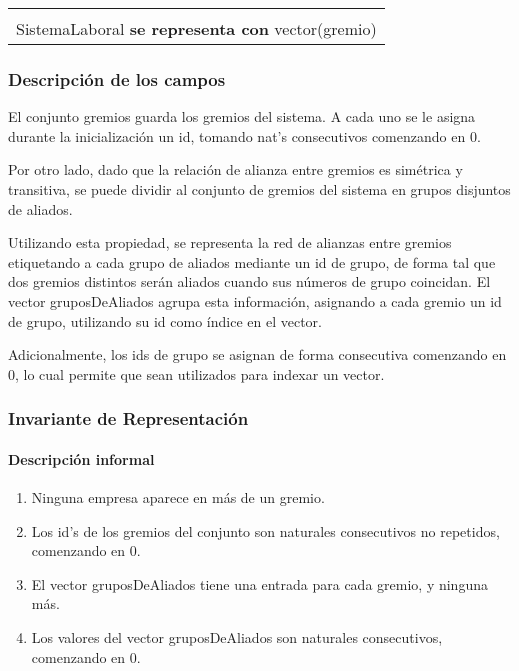 \begin{center}
\begin{tabular}{|l|} 
\hline
\\
SistemaLaboral \textbf{se representa con} vector(gremio) \\
\hline
\end{tabular}
\end{center}

\subsubsection{Descripci\'on de los campos}

	El conjunto gremios guarda los gremios del sistema. A cada uno se le asigna durante la inicializaci\'on un id, tomando nat's consecutivos comenzando en 0.

	Por otro lado, dado que la relaci\'on de alianza entre gremios es sim\'etrica y transitiva, se puede dividir al conjunto de gremios del sistema en grupos disjuntos de aliados.

	Utilizando esta propiedad, se representa la red de alianzas entre gremios etiquetando a cada grupo de aliados mediante un id de grupo, de forma tal que dos gremios distintos ser\'an aliados cuando sus n\'umeros de grupo coincidan. El vector gruposDeAliados agrupa esta informaci\'on, asignando a cada gremio un id de grupo, utilizando su id como \'indice en el vector. 

	Adicionalmente, los ids de grupo se asignan de forma consecutiva comenzando en 0, lo cual permite que sean utilizados para indexar un vector.

\subsubsection{Invariante de Representaci\'on}

\paragraph{Descripci\'on informal}

\begin{enumerate}
	\item Ninguna empresa aparece en m\'as de un gremio.
	\item Los id's de los gremios del conjunto son naturales consecutivos no repetidos, comenzando en 0.
	\item El vector gruposDeAliados tiene una entrada para cada gremio, y ninguna m\'as.
	\item Los valores del vector gruposDeAliados son naturales consecutivos, comenzando en 0.
\end{enumerate}

